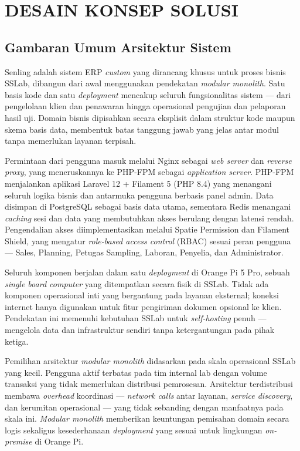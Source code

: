 \chapter{DESAIN KONSEP SOLUSI}
\label{chap:desain-konsep-solusi}

\section{Gambaran Umum Arsitektur Sistem}

Senling adalah sistem ERP \textit{custom} yang dirancang khusus untuk proses bisnis SSLab, dibangun dari awal menggunakan pendekatan \textit{modular monolith}. Satu basis kode dan satu \textit{deployment} mencakup seluruh fungsionalitas sistem — dari pengelolaan klien dan penawaran hingga operasional pengujian dan pelaporan hasil uji. Domain bisnis dipisahkan secara eksplisit dalam struktur kode maupun skema basis data, membentuk batas tanggung jawab yang jelas antar modul tanpa memerlukan layanan terpisah.

Permintaan dari pengguna masuk melalui Nginx sebagai \textit{web server} dan \textit{reverse proxy}, yang meneruskannya ke PHP-FPM sebagai \textit{application server}. PHP-FPM menjalankan aplikasi Laravel 12 + Filament 5 (PHP 8.4) yang menangani seluruh logika bisnis dan antarmuka pengguna berbasis panel admin. Data disimpan di PostgreSQL sebagai basis data utama, sementara Redis menangani \textit{caching} sesi dan data yang membutuhkan akses berulang dengan latensi rendah. Pengendalian akses diimplementasikan melalui Spatie Permission dan Filament Shield, yang mengatur \textit{role-based access control} (RBAC) sesuai peran pengguna — Sales, Planning, Petugas Sampling, Laboran, Penyelia, dan Administrator.

Seluruh komponen berjalan dalam satu \textit{deployment} di Orange Pi 5 Pro, sebuah \textit{single board computer} yang ditempatkan secara fisik di SSLab. Tidak ada komponen operasional inti yang bergantung pada layanan eksternal; koneksi internet hanya digunakan untuk fitur pengiriman dokumen opsional ke klien. Pendekatan ini memenuhi kebutuhan SSLab untuk \textit{self-hosting} penuh — mengelola data dan infrastruktur sendiri tanpa ketergantungan pada pihak ketiga.

Pemilihan arsitektur \textit{modular monolith} didasarkan pada skala operasional SSLab yang kecil. Pengguna aktif terbatas pada tim internal lab dengan volume transaksi yang tidak memerlukan distribusi pemrosesan. Arsitektur terdistribusi membawa \textit{overhead} koordinasi — \textit{network calls} antar layanan, \textit{service discovery}, dan kerumitan operasional — yang tidak sebanding dengan manfaatnya pada skala ini. \textit{Modular monolith} memberikan keuntungan pemisahan domain secara logis sekaligus kesederhanaan \textit{deployment} yang sesuai untuk lingkungan \textit{on-premise} di Orange Pi.

